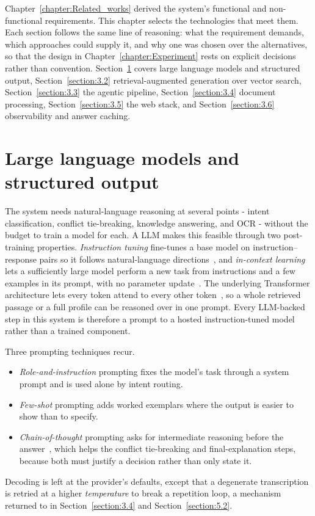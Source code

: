 \documentclass[../main.tex]{subfiles}
\begin{document}

Chapter~\ref{chapter:Related_works} derived the system's functional and non-functional requirements.
This chapter selects the technologies that meet them.
Each section follows the same line of reasoning: what the requirement demands, which approaches could supply it, and why one was chosen over the alternatives, so that the design in Chapter~\ref{chapter:Experiment} rests on explicit decisions rather than convention.
Section~\ref{section:3.1} covers large language models and structured output, Section~\ref{section:3.2} retrieval-augmented generation over vector search, Section~\ref{section:3.3} the agentic pipeline, Section~\ref{section:3.4} document processing, Section~\ref{section:3.5} the web stack, and Section~\ref{section:3.6} observability and answer caching.

\section{Large language models and structured output}
\label{section:3.1}

The system needs natural-language reasoning at several points - intent classification, conflict tie-breaking, knowledge answering, and \gls{OCR} - without the budget to train a model for each.
A \gls{LLM} makes this feasible through two post-training properties.
\textit{Instruction tuning} fine-tunes a base model on instruction--response pairs so it follows natural-language directions~\cite{ouyang2022instruct}, and \textit{in-context learning} lets a sufficiently large model perform a new task from instructions and a few examples in its prompt, with no parameter update~\cite{brown2020fewshot}.
The underlying Transformer architecture lets every token attend to every other token~\cite{vaswani2017attention}, so a whole retrieved passage or a full profile can be reasoned over in one prompt.
Every \gls{LLM}-backed step in this system is therefore a prompt to a hosted instruction-tuned model rather than a trained component.

Three prompting techniques recur.

\begin{itemize}
    \item \textit{Role-and-instruction} prompting fixes the model's task through a system prompt and is used alone by intent routing.
    \item \textit{Few-shot} prompting adds worked exemplars where the output is easier to show than to specify.
    \item \textit{Chain-of-thought} prompting asks for intermediate reasoning before the answer~\cite{wei2022cot}, which helps the conflict tie-breaking and final-explanation steps, because both must justify a decision rather than only state it.
\end{itemize}
Decoding is left at the provider's defaults, except that a degenerate transcription is retried at a higher \textit{temperature} to break a repetition loop, a mechanism returned to in Section~\ref{section:3.4} and Section~\ref{section:5.2}.
\end{document}
